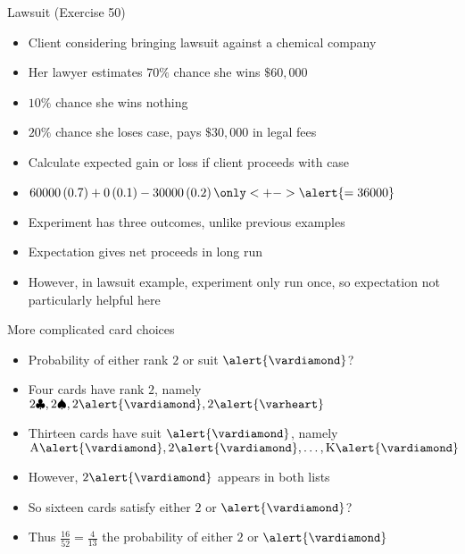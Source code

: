 \begin{frame}{Lawsuit (Exercise 50)}
\begin{itemize}
\item Client considering bringing lawsuit against a chemical company
\item Her lawyer estimates $70\%$ chance she wins $\$60,000$
\item $10\%$ chance she wins nothing
\item $20\%$ chance she loses case, pays $\$30,000$ in legal fees
\item Calculate expected gain or loss if client proceeds with case
\item $60000\left(0.7\right)
+0\left(0.1\right)-30000\left(0.2\right)
\only<+->{\alert{=36000}}$
\end{itemize}
\begin{remark}
\begin{itemize}
\item Experiment has \alert{three} outcomes, unlike previous examples
\item Expectation gives net proceeds \alert{in long run}
\item However, in lawsuit example, experiment only run once,
so expectation not particularly helpful here
\end{itemize}
\end{remark}
\end{frame}

\begin{frame}{More complicated card choices}
\begin{itemize}
\item Probability of \alert{either} rank $2$ or 
suit $\alert{\vardiamond}$?
\item Four cards have rank $2$, namely
$2\clubsuit, 2\spadesuit, 2\alert{\vardiamond}, 2\alert{\varheart}$
\item Thirteen cards have suit $\alert{\vardiamond}$, namely
$\text{A}\alert{\vardiamond},2\alert{\vardiamond},\ldots,
\text{K}\alert{\vardiamond}$
\item However, $2\alert{\vardiamond}$ appears in \alert{both} lists
\item So \alert{sixteen} cards satisfy \alert{either} $2$ or $\alert{\vardiamond}$?
\item Thus $\frac{16}{52}=\frac{4}{13}$ the probability of
\alert{either} $2$ or $\alert{\vardiamond}$
\end{itemize}
\end{frame}


